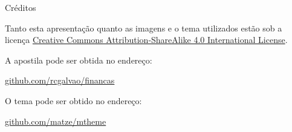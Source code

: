 \documentclass[10pt]{beamer}
\begin{document}
\begin{frame}{Créditos}

Tanto esta apresentação quanto as imagens e o tema utilizados estão sob a licença  \href{http://creativecommons.org/licenses/by-sa/4.0/}{Creative Commons
  Attribution-ShareAlike 4.0 International License}.
  \begin{center}\ccbysa\end{center}

A apostila pode ser obtida no endereço:
\begin{center}\url{github.com/rcgalvao/financas}\end{center}

O tema pode ser obtido no endereço: 
\begin{center}\url{github.com/matze/mtheme}\end{center}

\end{frame}
\end{document}
